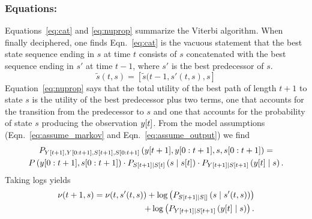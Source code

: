 \subsubsection*{Equations:}
Equations~\eqref{eq:cat} and \eqref{eq:nuprop} summarize the Viterbi
algorithm.  When finally deciphered, one finds Eqn.~\eqref{eq:cat} is
the vacuous statement that the best state sequence ending in $s$ at
time $t$ consists of $s$ concatenated with the best sequence ending
in $s'$ at time $t-1$, where $s'$ is the best predecessor of $s$.
\begin{equation}
  \label{eq:cat}
  \tilde s(t,s) = \left[ \tilde s(t-1,s'(t,s),s \right]
\end{equation}
Equation~\eqref{eq:nuprop} says that the total utility of the best
path of length $t+1$ to state $s$ is the utility of the best
predecessor plus two terms, one that accounts for the transition from
the predecessor to $s$ and one that accounts for the probability of
state $s$ producing the observation ${y}{[t]}$.  From the model
assumptions (Eqn.~\eqref{eq:assume_markov} and
Eqn.~\eqref{eq:assume_output}) we find
\begin{multline*}
  P_{{Y}{[t+1]},Y[0:t+1],{S}{[t+1]},S[0:t+1]}
  \left({y}{[t+1]},y[0:t+1],s,s[0:t+1] \right) =\\
  P\left(y[0:t+1], s[0:t+1] \right) \cdot
  P_{{S}{[t+1]}\mid {S}{[t]}} \left(s\mid {s}{[t]} \right) \cdot
  P_{{Y}{[t+1]}\mid {S}{[t+1]}} \left({y}{[t]}\mid s \right).
\end{multline*}
Taking logs yields
\begin{equation}
  \label{eq:nuprop}
  \begin{split}
    \nu (t+1,s) = \nu(t,s'(t,s)) +
    \log\left(P_{{S}{[t+1]}\mid {S}{[]}} \left(s\mid s'(t,s) \right)\right)\\
    \quad + \log \left( P_{{Y}{[t+1]}\mid {S}{[t+1]}}
      \left({y}{[t]}\mid s\right)\right).
  \end{split}
\end{equation}

